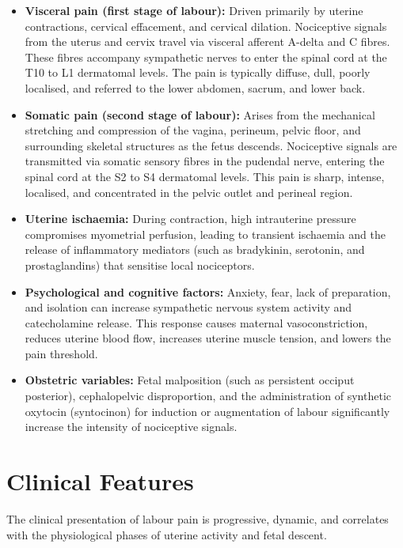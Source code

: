 \begin{itemize}
    \item \textbf{Visceral pain (first stage of labour):} Driven primarily by uterine contractions, cervical effacement, and cervical dilation. Nociceptive signals from the uterus and cervix travel via visceral afferent A-delta and C fibres. These fibres accompany sympathetic nerves to enter the spinal cord at the T10 to L1 dermatomal levels. The pain is typically diffuse, dull, poorly localised, and referred to the lower abdomen, sacrum, and lower back.
    \item \textbf{Somatic pain (second stage of labour):} Arises from the mechanical stretching and compression of the vagina, perineum, pelvic floor, and surrounding skeletal structures as the fetus descends. Nociceptive signals are transmitted via somatic sensory fibres in the pudendal nerve, entering the spinal cord at the S2 to S4 dermatomal levels. This pain is sharp, intense, localised, and concentrated in the pelvic outlet and perineal region.
    \item \textbf{Uterine ischaemia:} During contraction, high intrauterine pressure compromises myometrial perfusion, leading to transient ischaemia and the release of inflammatory mediators (such as bradykinin, serotonin, and prostaglandins) that sensitise local nociceptors.
    \item \textbf{Psychological and cognitive factors:} Anxiety, fear, lack of preparation, and isolation can increase sympathetic nervous system activity and catecholamine release. This response causes maternal vasoconstriction, reduces uterine blood flow, increases uterine muscle tension, and lowers the pain threshold.
    \item \textbf{Obstetric variables:} Fetal malposition (such as persistent occiput posterior), cephalopelvic disproportion, and the administration of synthetic oxytocin (syntocinon) for induction or augmentation of labour significantly increase the intensity of nociceptive signals.
\end{itemize}

\section*{Clinical Features}
The clinical presentation of labour pain is progressive, dynamic, and correlates with the physiological phases of uterine activity and fetal descent.

